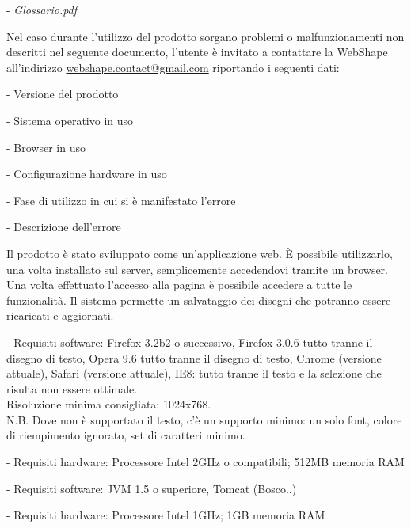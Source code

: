 \begin{elencopuntato}[\normindent]
	\item[-] \textit{Glossario.pdf}
\end{elencopuntato}

Nel caso durante l'utilizzo del prodotto sorgano problemi o malfunzionamenti non descritti nel seguente documento, l'utente \`e invitato a contattare la WebShape all'indirizzo \href{mailto:webshape.contact@gmail.com}{webshape.contact@gmail.com} riportando i seguenti dati:\\
\begin{elencopuntato}[\normindent]
	\item[-] Versione del prodotto
	\item[-] Sistema operativo in uso
	\item[-] Browser in uso
	\item[-] Configurazione hardware in uso
	\item[-] Fase di utilizzo in cui si \`e manifestato l'errore
	\item[-] Descrizione dell'errore
\end{elencopuntato}


Il prodotto \`e stato sviluppato come un'applicazione web. \`E possibile utilizzarlo, una volta installato sul server, semplicemente accedendovi tramite un browser. Una volta effettuato l'accesso alla pagina \`e possibile accedere a tutte le
funzionalit\`a. Il sistema permette un salvataggio dei disegni che potranno essere ricaricati e aggiornati.

\begin{elencopuntato}[\normindent]
    \item[-] Requisiti software: Firefox 3.2b2 o successivo, Firefox 3.0.6 tutto tranne il disegno di testo, Opera 9.6 tutto tranne il disegno di testo, Chrome (versione attuale), Safari (versione attuale), IE8: tutto tranne il testo e la selezione che risulta non essere ottimale.\\
    Risoluzione minima consigliata: 1024x768.\\
N.B. Dove non \`e supportato il testo, c'\`e un supporto minimo: un solo font, colore di riempimento ignorato, set di caratteri minimo. 
    \item[-] Requisiti hardware:  Processore Intel 2GHz o compatibili; 512MB memoria RAM 
\end{elencopuntato}
\begin{elencopuntato}[\normindent]
    \item[-] Requisiti software:  JVM 1.5 o superiore, Tomcat (Bosco..)
    \item[-] Requisiti hardware:  Processore Intel 1GHz; 1GB memoria RAM
\end{elencopuntato}

